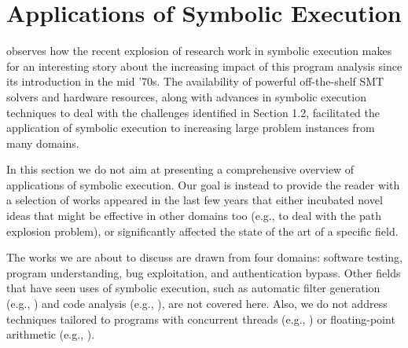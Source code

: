 
\section{Applications of Symbolic Execution}
\label{se:applications}

\cite{CGK-ICSE11} observes how the recent explosion of research work in symbolic execution makes for an interesting story about the increasing impact of this program analysis since its introduction in the mid '70s. The availability of powerful off-the-shelf SMT solvers and hardware resources, along with advances in symbolic execution techniques to deal with the challenges identified in Section 1.2, facilitated the application of symbolic execution to increasing large problem instances from many domains.


In this section we do not aim at presenting a comprehensive overview of applications of symbolic execution. Our goal is instead to provide the reader with a selection of works appeared in the last few years that either incubated novel ideas that might be effective in other domains too (e.g., to deal with the path explosion problem), or significantly affected the state of the art of a specific field.

The works we are about to discuss are drawn from four domains: software testing, program understanding, bug exploitation, and authentication bypass. Other fields that have seen uses of symbolic execution, such as automatic filter generation (e.g., \cite{BND-SP06,BOUNCER-SOSP07}) and code analysis (e.g., \cite{HMH-VSTTE12,BCP-USENIXSEC17}), are not covered here. Also, we do not address techniques tailored to programs with concurrent threads (e.g., \cite{BGC-OOPSLA14,GKW-ESEC15}) or floating-point arithmetic (e.g., \cite{RPW-SIGSOFT15,LSC-ASE17}).


